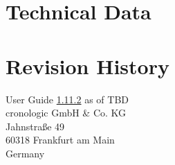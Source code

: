 \documentclass[12pt,notitlepage,a4paper]{report}
\newcommand{\ifxHPTDC}[2]{#1}
\newcommand{\ifxHPTDC}[2]{#2}
\newcommand{\ttinput}[1]{}
\newcommand{\ttinput}[1]{}
\newcommand{\ttinput}[1]{}
\newcommand{\ugrev}{{1.11.2}}
\begin{document}
    \chapter{Technical Data}    
        \ttinput{Tech.tex} 
        

    \ifxHPTDC{}{
    \chapter{Ordering Information} \label{cp:ordering_information}
        
    }
    
    \chapter{Revision History} 
        \noindent
        User Guide \hyperlink{ugrev}{\ugrev} as of TBD\\  %
        cronologic GmbH \& Co. KG\\
        Jahnstraße 49\\
        60318 Frankfurt am Main\\Germany\\
        \ttinput{FwRev.tex}
        \ifxHPTDC{}{} 
        

    \ifxHPTDC{}{
    \phantomsection
    \addcontentsline{toc}{chapter}{Erratum}
    \chapter*{Erratum}
        
    }
\end{document}
